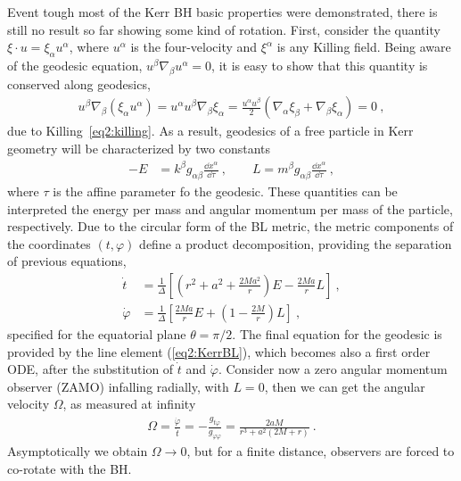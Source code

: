 Event tough most of the Kerr BH basic properties were demonstrated, there is still no result so far showing some kind of rotation.
First, consider the quantity $\xi\cdot u = \xi_\alpha u^\alpha$, where $u^\alpha$ is the four-velocity and $\xi^\alpha$ is any Killing field. 
Being aware of the geodesic equation, $u^\beta \nabla_\beta u^\alpha = 0$, it is easy to show that this quantity is conserved along geodesics,
\begin{align}
    u^\beta \nabla_\beta ( \xi_\alpha u^\alpha ) = u^\alpha u^\beta \nabla_\beta \xi_\alpha = \frac{u^\alpha u^\beta }{2} \left( \nabla_\alpha \xi_\beta + \nabla_\beta \xi_\alpha \right) = 0 ~,
    \label{eq2:geodesicKilling}
\end{align}
due to Killing~\eqref{eq2:killing}.
As a result, geodesics of a free particle in Kerr geometry will be characterized by two constants
\begin{align}
    -E &=  k^\beta g_{\alpha\beta} \frac{\dd x^\alpha}{\dd \tau} ~, \qquad L = m^\beta g_{\alpha\beta} \frac{\dd x^\alpha}{\dd \tau} ~,
    \label{eq2:geodesicConsts}
\end{align}
where $\tau$ is the affine parameter fo the geodesic.
These quantities can be interpreted the energy per mass and angular momentum per mass of the particle, respectively.
Due to the circular form of the BL metric, the metric components of the coordinates $(t,\varphi)$ define a product decomposition, providing the separation of previous equations, 
\begin{align}
    \dot{t} &= \frac{1}{\Delta} \left[ (r^2+a^2 +\frac{2 M a^2}{r})E - \frac{2 M a}{r} L \right] ~, \label{eq2:geodesicT} \\
    \dot{\varphi} &= \frac{1}{\Delta} \left[ \frac{2 M a}{r} E +\left( 1- \frac{2 M}{r} \right) L \right]  ~,
    \label{eq2:geodesicPhi}
\end{align}
specified for the equatorial plane $\theta=\pi/2$. The final equation for the geodesic is provided by the line element (\ref{eq2:KerrBL}), which becomes also a first order ODE, after the substitution of $\dot{t}$ and $\dot{\varphi}$. Consider now a zero angular momentum observer (ZAMO) infalling radially, with $L=0$, then we can get the angular velocity $\Omega$, as measured at infinity
\begin{align}
    \Omega = \frac{\dot{\varphi}}{\dot{t}} = - \frac{g_{t\varphi}}{g_{\varphi\varphi}} = \frac{2 a M}{r^3 + a^2 (2 M+r)} ~.
    \label{eq2:angMomentumZAMO}
\end{align}
Asymptotically we obtain $\Omega\to0$, but for a finite distance, observers are forced to co-rotate with the BH. 
